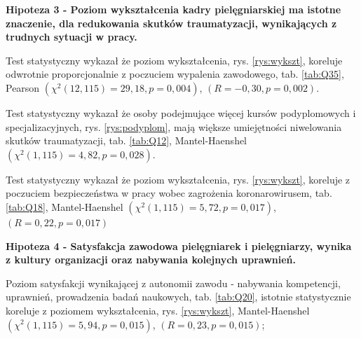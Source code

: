 \documentclass[a4paper,12pt,twoside,openright]{mwrep}
\begin{document}

\vspace{\baselineskip} 
\textbf{Hipoteza 3 - Poziom wykształcenia kadry pielęgniarskiej ma istotne znaczenie, dla redukowania skutków traumatyzacji, wynikających z trudnych sytuacji w pracy.}
\vspace{\baselineskip} 


	Test statystyczny wykazał że poziom wykształcenia, rys. \ref{rys:wykszt}, koreluje odwrotnie proporcjonalnie z poczuciem wypalenia zawodowego, tab. \ref{tab:Q35}, Pearson $(\chi^2 (12, 115) = 29,18, p=0,004)$, $(R = -0,30, p = 0,002)$. 
		
	Test statystyczny wykazał że osoby podejmujące więcej kursów podyplomowych i specjalizacyjnych, rys. \ref{rys:podyplom}, mają większe umiejętności niwelowania skutków traumatyzacji, tab. \ref{tab:Q12}, Mantel-Haenshel $(\chi^2 (1, 115) = 4,82, p=0,028)$. 


	Test statystyczny wykazał że poziom wykształcenia, rys. \ref{rys:wykszt}, koreluje z poczuciem bezpieczeństwa w pracy wobec zagrożenia koronarowirusem, tab. \ref{tab:Q18}, Mantel-Haenshel $(\chi^2 (1, 115) = 5,72, p=0,017)$, $(R = 0,22, p = 0,017)$
	
\vspace{\baselineskip}
\textbf{Hipoteza 4 - Satysfakcja zawodowa pielęgniarek i pielęgniarzy, wynika z kultury organizacji oraz nabywania kolejnych uprawnień.}
\vspace{\baselineskip}




  
  Poziom satysfakcji wynikającej z autonomii zawodu  - nabywania kompetencji, uprawnień, prowadzenia badań naukowych, tab. \ref{tab:Q20}, istotnie statystycznie koreluje z poziomem wykształcenia, rys. \ref{rys:wykszt}, Mantel-Haenshel $(\chi^2 (1, 115) = 5,94, p = 0,015)$, $(R = 0,23, p = 0,015)$; 
  
\end{document}
